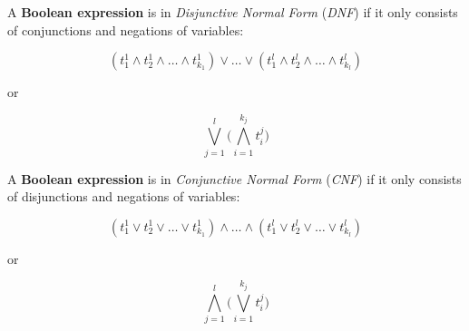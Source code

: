 \documentclass[12pt]{article}
\begin{document}
\begin{landscape}

\centerline{A \textbf{Boolean expression} is in \textit{Disjunctive Normal Form} (\textit{DNF}) if it only consists of conjunctions and negations of variables:}
	$$ (t_1^1 \wedge t_2^1 \wedge \dots \wedge t_{k_1}^1) \vee \dots \vee (t_1^l \wedge t_2^l \wedge \dots \wedge t_{k_l}^l) $$ 

\centerline{or}

	$$ \bigvee_{j=1}^l \Bigg(\bigwedge_{i=1}^{k_j} t_i^j \Bigg) $$

\centerline{A \textbf{Boolean expression} is in \textit{Conjunctive Normal Form} (\textit{CNF}) if it only consists of disjunctions and negations of variables:}
	$$ (t_1^1 \vee t_2^1 \vee \dots \vee t_{k_1}^1) \wedge \dots \wedge (t_1^l \vee t_2^l \vee \dots \vee t_{k_l}^l) $$ 

\centerline{or}

	$$ \bigwedge_{j=1}^l \Bigg(\bigvee_{i=1}^{k_j} t_i^j \Bigg) $$

\end{landscape}
\end{document}
